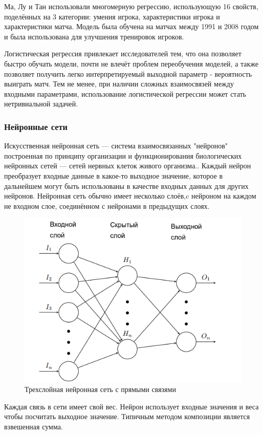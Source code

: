 Ма, Лу и Тан\cite{Book11} использовали многомерную регрессию, использующую 16 свойств, поделённых на 3 категории: умения игрока, характеристики игрока и характеристики матча. Модель была обучена на матчах между 1991 и 2008 годом и была использована для улучшения тренировок игроков.

Логистическая регрессия привлекает исследователей тем, что она позволяет быстро обучать модели, почти не влечёт проблем переобучения моделей, а также позволяет получить легко интерпретируемый выходной параметр - вероятность выиграть матч. Тем не менее, при наличии сложных взаимосвязей между входными параметрами, использование логистической регрессии может стать нетривиальной задачей.

\subsubsection{Нейронные сети}
Искусственная нейронная сеть — система взаимосвязанных "нейронов"\,  построенная по принципу организации и функционирования биологических нейронных сетей — сетей нервных клеток живого организма.. Каждый нейрон преобразует входные данные в какое-то выходное значение, которое в дальнейшем могут быть использованы в качестве входных данных для других нейронов. Нейронная сеть обычно имеет несколько слоёв,c нейроном на каждом не входном слое, соединённом с нейронами в предыдущих слоях.
\begin{figure}[!h]
	\centering
	\includegraphics[width=.9\textwidth]{master_img/img1_edited.png}
	\caption{Трехслойная нейронная сеть с прямыми связями}
	\label{fig01}
\end{figure}
Каждая связь в сети имеет свой вес. Нейрон использует входные значения и веса чтобы посчитать выходное значение. Типичным методом композиции является  взвешенная сумма.

